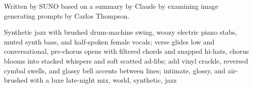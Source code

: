 
\begin{notes}
Written by SUNO based on a summary by Claude by examining image generating prompts by Carlos Thompson.
\end{notes}
\begin{style}
Synthetic jazz with brushed drum-machine swing, woozy electric piano stabs, muted synth bass, and half-spoken female vocals; verse glides low and conversational, pre-chorus opens with filtered chords and snapped hi-hats, chorus blooms into stacked whispers and soft scatted ad-libs; add vinyl crackle, reversed cymbal swells, and glassy bell accents between lines; intimate, glossy, and air-brushed with a luxe late-night mix, world, synthetic, jazz
\end{style}
